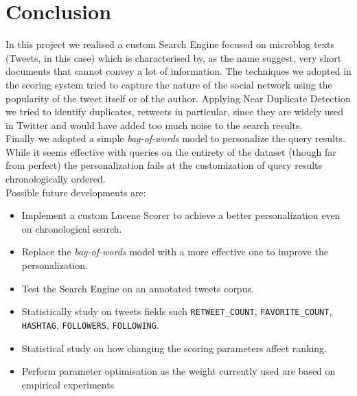 \documentclass[a4paper,12pt,openany,oneside]{article}
\begin{document}





\section{Conclusion}

In this project we realised a custom Search Engine focused on microblog texts (Tweets, in this case) which is characterised by, as the name suggest, very short documents that cannot convey a lot of information. The techniques we adopted in the scoring system tried to capture the nature of the social network using the popularity of the tweet itself or of the author. Applying Near Duplicate Detection we tried to identify duplicates, retweets in particular, since they are widely used in Twitter and would have added too much noise to the search results.
\\[0.8em]
Finally we adopted a simple \textit{bag-of-words} model to personalize the query results. While it seems effective with queries on the entirety of the dataset (though far from perfect) the personalization fails at the customization of query results chronologically ordered.
\\[0.8em]
Possible future developments are:
\begin{itemize}
    \item Implement a custom Lucene Scorer to achieve a better personalization even on chronological search.
    \item Replace the \textit{bag-of-words} model with a more effective one to improve the personalization.
    \item Test the Search Engine on an annotated tweets corpus.
    \item Statistically study on tweets fields such \verb|RETWEET_COUNT|, \verb|FAVORITE_COUNT|, \verb|HASHTAG|, \verb|FOLLOWERS|, \verb|FOLLOWING|.
    \item Statistical study on how changing the scoring parameters affect ranking.
    \item Perform parameter optimisation as the weight currently used are based on empirical experiments
\end{itemize}
\end{document}
